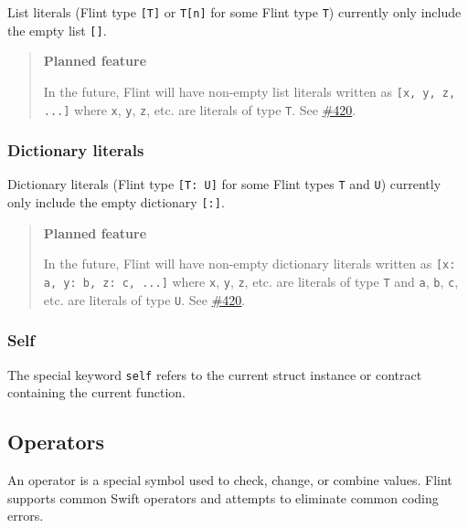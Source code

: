 List literals (Flint type \texttt{[T]} or \texttt{T[n]} for some Flint type \texttt{T}) currently only include the empty list \texttt{[]}.

\begin{quote}
\textbf{Planned feature}

In the future, Flint will have non-empty list literals written as \texttt{[x, y, z, ...]} where \texttt{x}, \texttt{y}, \texttt{z}, etc. are literals of type \texttt{T}. See \href{https://github.com/flintlang/flint/issues/420}{\#420}.
\end{quote}

\subsubsection{Dictionary literals}
\label{sec:appendix-b-dictionary-literals}

Dictionary literals (Flint type \texttt{[T: U]} for some Flint types \texttt{T} and \texttt{U}) currently only include the empty dictionary \texttt{[:]}.

\begin{quote}
\textbf{Planned feature}

In the future, Flint will have non-empty dictionary literals written as \texttt{[x: a, y: b, z: c, ...]} where \texttt{x}, \texttt{y}, \texttt{z}, etc. are literals of type \texttt{T} and \texttt{a}, \texttt{b}, \texttt{c}, etc. are literals of type \texttt{U}. See \href{https://github.com/flintlang/flint/issues/420}{\#420}.
\end{quote}

\subsubsection{Self}
\label{sec:appendix-b-self}

The special keyword \texttt{self} refers to the current struct instance or contract containing the current function.

\subsection{Operators}
\label{sec:appendix-b-operators}

An operator is a special symbol used to check, change, or combine values. Flint supports common Swift operators and attempts to eliminate common coding errors.

